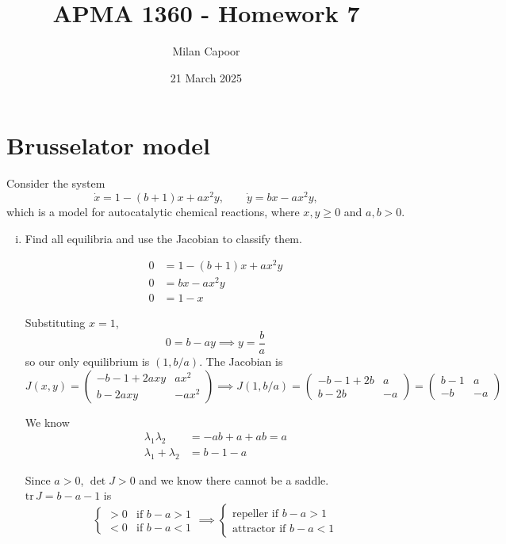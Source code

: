 \documentclass[12pt]{article}
\title{APMA 1360 - Homework 7}
\author{Milan Capoor}
\date{21 March 2025}
\newcommand{\tr}{\text{tr}\,}
\begin{document}
\maketitle


\section{Brusselator model}

Consider the system
\[
    \dot{x} = 1 - (b+1) x + a x^2 y, \qquad
    \dot{y} = b x - a x^2 y,
\]
which is a model for autocatalytic chemical reactions, where $x,y\geq0$ and $a,b>0$.
\begin{enumerate}[(i)]
    \item Find all equilibria and use the Jacobian to classify them.

          \color{blue}
          \[\begin{array}{rl}
                  0 & = 1 - (b+1)x + ax^2y \\
                  0 & = b x - a x^2 y      \\ \hline
                  0 & = 1 - x
              \end{array}\]

          Substituting $x = 1$,
          \[0 = b - ay \implies y = \frac{b}{a}\]
          so our only equilibrium is $\boxed{(1, b/a)}$. The Jacobian is
          \[J(x, y) = \begin{pmatrix}
                  -b-1 + 2axy & ax^2  \\
                  b - 2axy    & -ax^2
              \end{pmatrix} \implies J(1, b/a) = \begin{pmatrix}
                  -b -1 + 2b & a  \\
                  b - 2b     & -a
              \end{pmatrix} = \begin{pmatrix}
                  b - 1 & a  \\
                  -b    & -a
              \end{pmatrix}\]


          We know
          \begin{align*}
              \lambda_1 \lambda_2   & = -ab + a + ab = a \\
              \lambda_1 + \lambda_2 & = b-1 - a
          \end{align*}

          Since $a > 0$, $\det J > 0$ and we know there cannot be a saddle. $\tr J = b - a - 1$ is
          \[\begin{cases}
                  > 0 & \text{if } b-a > 1  \\
                  < 0 & \text{if } b- a < 1
              \end{cases} \implies \boxed{\begin{cases}
                      \text{repeller if } b-a > 1 \\
                      \text{attractor if } b-a < 1
                  \end{cases}}\]


\end{enumerate}
\end{document}
